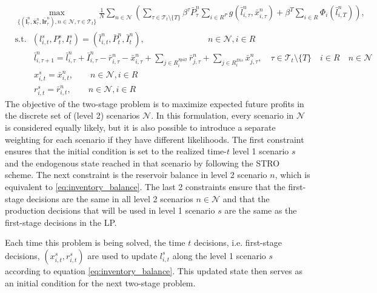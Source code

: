 \begin{equation}
\label{eq:twostage_formulation}
\begin{split}
    &\max_{\{(\boldsymbol{\bar{l}}_\tau^n,\boldsymbol{\bar{x}}_\tau^n,\boldsymbol{\bar{lr}}_\tau^n), n \in \mathcal{N}, \tau \in \mathcal{T}_t\}} \frac{1}{N} \sum_{n\in \mathcal{N}}\left( \sum_{\tau \in \mathcal{T}_t\setminus \{T\}}\beta^{\tau}\bar{P}^{n}_{\tau}\sum_{i\in R^P}g(\bar{l}_{i,\tau}^n,\bar{x}_{i,\tau}^n) + \beta^{T}\sum_{i\in R}\Phi_{i}(\bar{l}_{i,T}^n) \right), \\
    & \mathrm{s.t.} \ \ \ (l_{i,t}^s, P_{t}^s, I_{t}^s) = (\bar{l}_{i,t}^{n}, \bar{P}_t^{n}, \bar{I}_t^{n}), \quad \quad \quad \quad \quad \quad \quad \ \ n \in \mathcal{N}, i \in R \\
    & \quad \quad \ \bar{l}^n_{i,\tau+1} = \bar{l}^n_{i,\tau} + \bar{I}^{n}_{i,\tau} - \bar{r}^n_{i,\tau} - \bar{x}^n_{i,\tau} + \sum_{j\in R_{i}^{Spill}} \bar{r}^n_{j,\tau}+ \sum_{j\in R_{i}^{Dis}} \bar{x}^n_{j,\tau}, \quad \tau \in \mathcal{T}_t \setminus \{T\} \quad i\in R  \quad n\in \mathcal{N}\\
    & \quad \quad \ x^s_{i,t} =  \bar{x}^{n}_{i,t}, \quad \quad n \in \mathcal{N}, i\in R \\
    & \quad \quad \ r^s_{i,t} =  \bar{r}^{n}_{i,t}, \quad \quad n \in \mathcal{N}, i\in R 
\end{split}
\end{equation}
The objective of the two-stage problem is to maximize expected future profits in the discrete set of (level 2) scenarios $\mathcal{N}$. In this formulation, every scenario in $\mathcal{N}$ is considered equally likely, but it is also possible to introduce a separate weighting for each scenario if they have different likelihoods. The first constraint ensures that the initial condition is set to the realized time-$t$ level 1 scenario $s$ and the endogenous state reached in that scenario by following the STRO scheme. The next constraint is the reservoir balance in level 2 scenario $n$, which is equivalent to \eqref{eq:inventory_balance}. The last 2 constraints ensure that the first-stage decisions are the same in all level 2 scenarios $n \in \mathcal{N}$ and that the production decisions that will be used in level 1 scenario $s$ are the same as the first-stage decisions in the LP.  

Each time this problem is being solved, the time $t$ decisions, i.e. first-stage decisions, $(x_{i,t}^s, r_{i,t}^s)$ are used to update $l_{i,t}^s$ along the level 1 scenario $s$ according to equation \eqref{eq:inventory_balance}. This updated state then serves as an initial condition for the next two-stage problem. 

